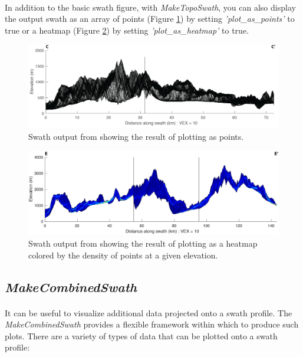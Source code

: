 \paragraph{}In addition to the basic swath figure, with \textit{MakeTopoSwath}, you can also display the output swath as an array of points (Figure \ref{fig:PointSwath}) by setting \textit{'plot\_as\_points'} to true or a heatmap (Figure \ref{fig:HeatSwath}) by setting \textit{'plot\_as\_heatmap'} to true.

\begin{figure}[H]
	\centering
	\includegraphics[width=16.5cm]{PNGs/SantAnaSwath_Points.png}
	\caption{Swath output from  showing the result of plotting as points.}
	\label{fig:PointSwath}
\end{figure}

\begin{figure}[H]
	\centering
	\includegraphics[width=16.5cm]{PNGs/Cross_SwathHeatmap.png}
	\caption{Swath output from  showing the result of plotting as a heatmap colored by the density of points at a given elevation.}
	\label{fig:HeatSwath}
\end{figure}

\subsection{\textit{MakeCombinedSwath}} \label{sec:CombSwath}
\paragraph{}It can be useful to visualize additional data projected onto a swath profile. The \textit{MakeCombinedSwath} provides a flexible framework within which to produce such plots. There are a variety of types of data that can be plotted onto a swath profile:

